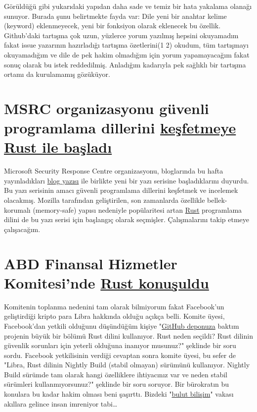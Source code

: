 \documentclass[11pt]{article}
\begin{document}
Görüldüğü gibi yukarıdaki yapıdan daha sade ve temiz bir hata yakalama olanağı
sunuyor. Burada şunu belirtmekte fayda var: Dile yeni bir anahtar kelime
(keyword) eklenmeyecek, yeni bir fonksiyon olarak eklenecek bu özellik.
Github'daki tartışma çok uzun, yüzlerce yorum yazılmış hepsini okuyamadım fakat
issue yazarının hazırladığı tartışma özetlerini(1 2) okudum, tüm tartışmayı
okuyamadığım ve dile de pek hakim olmadığım için yorum yapamayacağım fakat
sonuç olarak bu istek reddedilmiş. Anladığım kadarıyla pek sağlıklı bir
tartışma ortamı da kurulamamış gözüküyor.
\section{MSRC organizasyonu güvenli programlama dillerini \href{https://www.zdnet.com/article/microsoft-to-explore-using-rust/}{keşfetmeye Rust ile başladı}}
\label{sec:org22b39ed}
Microsoft Security Response Centre organizasyonu, bloglarında bu hafta
yayınladıkları \href{https://msrc-blog.microsoft.com/2019/07/16/a-proactive-approach-to-more-secure-code/}{blog yazısı} ile birlikte yeni bir yazı serisine başladıklarını
duyurdu. Bu yazı serisinin amacı güvenli programlama dillerini keşfetmek ve
incelemek olacakmış. Mozilla tarafından geliştirilen, son zamanlarda özellikle
bellek-korumalı (memory-safe) yapısı nedeniyle popülaritesi artan \href{https://www.rust-lang.org/}{Rust}
programlama dilini de bu yazı serisi için başlangıç olarak seçmişler.
Çalışmalarını takip etmeye çalışacağım.
\section{ABD Finansal Hizmetler Komitesi'nde \href{https://www.c-span.org/video/?c4808083/rust-language-chosen}{Rust konuşuldu}}
\label{sec:orgb4e68ad}
Komitenin toplanma nedenini tam olarak bilmiyorum fakat Facebook'un
geliştirdiği kripto para Libra hakkında olduğu açıkça belli. Komite üyesi,
Facebook'dan yetkili olduğunu düşündüğüm kişiye "\href{https://github.com/libra/libra}{GitHub deponuza} baktım
projenin büyük bir bölümü Rust dilini kullanıyor. Rust neden seçildi? Rust
dilinin güvenlik sorunları için yeterli olduğuna inanıyor musunuz?" şeklinde
bir soru sordu. Facebook yetkilisinin verdiği cevaptan sonra komite üyesi, bu
sefer de "Libra, Rust dilinin Nightly Build (stabil olmayan) sürümünü
kullanıyor. Nightly Build sürümde tam olarak hangi özelliklere ihtiyacınız var
ve neden stabil sürümleri kullanmıyorsunuz?" şeklinde bir soru soruyor. Bir
bürokratın bu konulara bu kadar hakim olması beni şaşırttı. Bizdeki "\href{https://www.youtube.com/watch?v=Sn7pNTsY5iY}{bulut
bilişim}" vakası akıllara gelince insan imreniyor tabi\ldots{}
\end{document}

